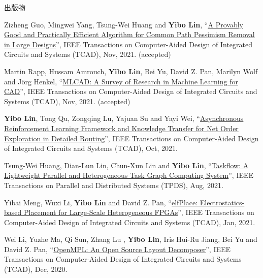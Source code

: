 \begin{rSection}{出版物}
\begin{description}[font=\normalfont, rightmargin=2em]
\item[{[J31]}]{
        Zizheng Guo, Mingwei Yang, Tsung-Wei Huang and \textbf{Yibo Lin}, 
    ``\href{https://doi.org/10.1109/TCAD.2021.3124758}{A Provably Good and Practically Efficient Algorithm for Common Path Pessimism Removal in Large Designs}'', 
    IEEE Transactions on Computer-Aided Design of Integrated Circuits and Systems (TCAD), Nov, 2021.
    (accepted)
}
            

\item[{[J30]}]{
        Martin Rapp, Hussam Amrouch, \textbf{Yibo Lin}, Bei Yu, David Z. Pan, Marilyn Wolf and Jörg Henkel, 
    ``\href{https://doi.org/10.1109/TCAD.2021.3124762}{MLCAD: A Survey of Research in Machine Learning for CAD}'', 
    IEEE Transactions on Computer-Aided Design of Integrated Circuits and Systems (TCAD), Nov, 2021.
    (accepted)
}
            

\item[{[J29]}]{
        \textbf{Yibo Lin}, Tong Qu, Zongqing Lu, Yajuan Su and Yayi Wei, 
    ``\href{https://doi.org/10.1109/TCAD.2021.3117505}{Asynchronous Reinforcement Learning Framework and Knowledge Transfer for Net Order Exploration in Detailed Routing}'', 
    IEEE Transactions on Computer-Aided Design of Integrated Circuits and Systems (TCAD), Oct, 2021.
    
}
            

\item[{[J28]}]{
        Tsung-Wei Huang, Dian-Lun Lin, Chun-Xun Lin and \textbf{Yibo Lin}, 
    ``\href{https://doi.org/10.1109/TPDS.2021.3104255}{Taskflow: A Lightweight Parallel and Heterogeneous Task Graph Computing System}'', 
    IEEE Transactions on Parallel and Distributed Systems (TPDS), Aug, 2021.
    
}
            

\item[{[J27]}]{
        Yibai Meng, Wuxi Li, \textbf{Yibo Lin} and David Z. Pan, 
    ``\href{https://doi.org/10.1109/TCAD.2021.3053191}{elfPlace: Electrostatics-based Placement for Large-Scale Heterogeneous FPGAs}'', 
    IEEE Transactions on Computer-Aided Design of Integrated Circuits and Systems (TCAD), Jan, 2021.
    
}
            

\item[{[J26]}]{
        Wei Li, Yuzhe Ma, Qi Sun,  Zhang Lu , \textbf{Yibo Lin}, Iris Hui-Ru Jiang, Bei Yu and David Z. Pan, 
    ``\href{https://doi.org/10.1109/TCAD.2020.3042175}{OpenMPL: An Open Source Layout Decomposer}'', 
    IEEE Transactions on Computer-Aided Design of Integrated Circuits and Systems (TCAD), Dec, 2020.
    
}
\end{description}
\end{rSection}
